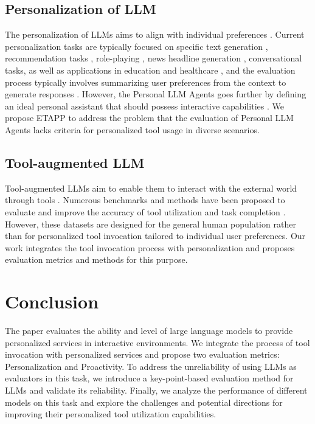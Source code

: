\documentclass[11pt]{article}
\begin{document}
\subsection{Personalization of LLM}
The personalization of LLMs aims to align with individual preferences \cite{zollo2025personalllm, tseng2024talespersonallmssurvey}. Current personalization tasks are typically focused on specific text generation \cite{he2025cosenhancingpersonalizationmitigating, zhao2025do, lee2024aligningthousandspreferencesmessage}, recommendation tasks \cite{yang2023palrpersonalizationawarellms}, role-playing \cite{wang-etal-2024-rolellm, shao-etal-2023-character}, news headline generation \cite{salemi-etal-2024-lamp}, conversational tasks, as well as applications in education \cite{Pratama2023REVOLUTIONIZINGEH} and healthcare \cite{10.1145/3437963.3441657, abbasian2024conversationalhealthagentspersonalized}, and the evaluation process typically involves summarizing user preferences from the context to generate responses \cite{zhang2024guidedprofilegenerationimproves}. However, the Personal LLM Agents goes further by defining an ideal personal assistant that should possess interactive capabilities \cite{singh-etal-2024-personal}. We propose ETAPP to address the problem that the evaluation of Personal LLM Agents lacks criteria for personalized tool usage in diverse scenarios.  









\subsection{Tool-augmented LLM}
Tool-augmented LLMs aim to enable them to interact with the external world through tools \cite{10.1145/3704435, qu2025tool}. Numerous benchmarks and methods have been proposed to evaluate and improve the accuracy of tool utilization and task completion \cite{trivedi-etal-2024-appworld,li-etal-2023-api, hao2024citienhancingtoolutilizing, tang2023toolalpacageneralizedtoollearning, NEURIPS2023_9cb2a749}. However, these datasets are designed for the general human population rather than for personalized tool invocation tailored to individual user preferences. Our work integrates the tool invocation process with personalization and proposes evaluation metrics and methods for this purpose.




\section{Conclusion}
The paper evaluates the ability and level of large language models to provide personalized services in interactive environments. We integrate the process of tool invocation with personalized services and propose two evaluation metrics: Personalization and Proactivity. To address the unreliability of using LLMs as evaluators in this task, we introduce a key-point-based evaluation method for LLMs and validate its reliability. Finally, we analyze the performance of different models on this task and explore the challenges and potential directions for improving their personalized tool utilization capabilities.
\end{document}
